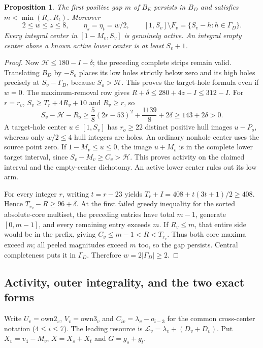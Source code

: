 \documentclass[11pt,letterpaper]{article}
\newtheorem{proposition}[theorem]{Proposition}
\theoremstyle{definition}\newtheorem{definition}[theorem]{Definition}
\begin{document}
\begin{proposition}\label{prop:p3-boundary}
The first positive gap $m$ of $B_E$ persists in $B_D$ and satisfies
$m<\min(R_s,R_t)$. Moreover
\[
2\le w\le z\le8,\qquad \eta_s=\eta_t=w/2,\qquad
[1,S_v]\setminus F_v=\{S_v-h:h\in\Gamma_D\}.
\]
Every integral center in $[1-M_v,S_v]$ is genuinely active. An integral
empty center above a known active lower center is at least $S_v+1$.
\end{proposition}
\begin{proof}
Now $\mathcal H\le180-I-\delta$; the preceding complete strips remain
valid. Translating $B_D$ by $-S_o$ places its low holes strictly below zero
and its high holes precisely at $S_v-\Gamma_D$, because $S_o>\mathcal H$.
This proves the target-hole formula even if $w=0$.
The maximum-removal row gives $R+\delta\le280+4z-I\le312-I$.
For $r=r_v$, $S_v\ge T_r+4R_v+10$ and $R_v\ge r$, so
\[
S_v-\mathcal H-R_o
\ge\frac58(2r-53)^2+\frac{1139}{8}+2\delta
\ge143+2\delta>0.
\]
A target-hole center $u\in[1,S_v]$ has $r_o\ge22$ distinct positive
hull images $u-P_o$, whereas only $w/2\le4$ hull integers are holes.
An ordinary nonhole center uses the source point zero. If
$1-M_v\le u\le0$, the image $u+M_v$ is in the complete lower target
interval, since $S_v-M_v\ge C_v>\mathcal H$. This proves activity on
the claimed interval and the empty-center dichotomy. An active lower
center rules out its low arm.

For every integer $r$, writing $t=r-23$ yields
$T_r+I=408+t(3t+1)/2\ge408$. Hence $T_{r_v}-R\ge96+\delta$.
At the first failed greedy inequality for the sorted absolute-core
multiset, the preceding entries have total $m-1$, generate $[0,m-1]$,
and every remaining entry exceeds $m$. If $R_v\le m$, that entire
side would be in the prefix, giving $C_v\le m-1<R<T_{r_v}$.
Thus both core maxima exceed $m$; all peeled magnitudes exceed $m$ too,
so the gap persists. Central completeness puts it in $\Gamma_D$.
Therefore $w=2|\Gamma_D|\ge2$.
\end{proof}

\subsection{Activity, outer integrality, and the two exact forms}
Write $U_v=\mathrm{own2}_v$, $V_v=\mathrm{own3}_v$ and
$C_{iv}=\lambda_v-o_{i-3}$ for the common cross-center notation ($4\le i\le7$). The leading resource
is $\mathcal L_v=\lambda_v+(D_v+D_v)$. Put
$X_v=v_4-M_v$, $X=X_s+X_t$ and $G=g_s+g_t$.
\end{document}
